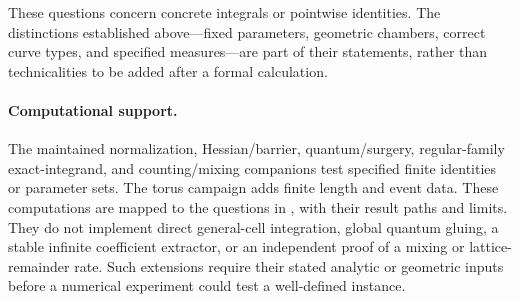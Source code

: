 These questions concern concrete integrals or pointwise identities. The
distinctions established above---fixed parameters, geometric chambers,
correct curve types, and specified measures---are part of their statements,
rather than technicalities to be added after a formal calculation.

\paragraph{Computational support.}
The maintained normalization, Hessian/barrier, quantum/surgery,
regular-family exact-integrand, and counting/mixing companions test
specified finite identities or parameter sets. The torus campaign adds
finite length and event data. These computations are mapped to the
questions in , with their result
paths and limits. They do not implement direct general-cell integration,
global quantum gluing, a stable infinite coefficient extractor, or an
independent proof of a mixing or lattice-remainder rate. Such extensions
require their stated analytic or geometric inputs before a numerical
experiment could test a well-defined instance.
